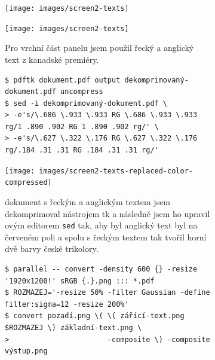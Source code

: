 \begin{figure}[p]
\begin{subfigure}{\linewidth}
\centering
\texttt{[image: images/screen2-texts]}
\par\vspace{3.5pt}
\texttt{[image: images/screen2-texts]}
\par\vspace{-1.5pt}
\caption{Pro vrchní část panelu jsem použil řecký a anglický text z kanadské premiéry.~\cite{morland2018fantasia}}
\label{fig:screen2-texts-greek-and-english-original}
\end{subfigure}
\par\vspace{10pt}
\begin{subfigure}{\linewidth}
\begingroup
\footnotesize
\begin{verbatim}
$ pdftk dokument.pdf output dekomprimovaný-dokument.pdf uncompress
$ sed -i dekomprimovaný-dokument.pdf \
> -e's/\.686 \.933 \.933 RG \.686 \.933 \.933 rg/1 .890 .902 RG 1 .890 .902 rg/' \
> -e's/\.627 \.322 \.176 RG \.627 \.322 \.176 rg/.184 .31 .31 RG .184 .31 .31 rg/'
\end{verbatim}
\endgroup
\par\vspace{1.5pt}
\centering
\texttt{[image: images/screen2-texts-replaced-color-compressed]}
\par\vspace{-1.5pt}
\caption{ dokument s řeckým a anglickým textem jsem dekomprimoval nástrojem \acro{PDF}tk a následně jsem ho upravil ovým editorem \texttt{sed} tak, aby byl anglický text byl na červeném poli a spolu s řeckým textem tak tvořil horní dvě barvy české trikolory.}
\label{fig:screen2-texts-greek-and-english-updated}
\end{subfigure}
\par\vspace{10pt}
\begin{subfigure}{\linewidth}
\begingroup
\footnotesize
\begin{verbatim}
$ parallel -- convert -density 600 {} -resize '1920x1200!' sRGB {.}.png ::: *.pdf
$ ROZMAZEJ='-resize 50% -filter Gaussian -define filter:sigma=12 -resize 200%'
$ convert pozadí.png \( \( zářící-text.png $ROZMAZEJ \) základní-text.png \
>                       -composite \) -composite výstup.png
\end{verbatim}
\endgroup
\par\vspace{1.5pt}

\end{subfigure}
\end{figure}
